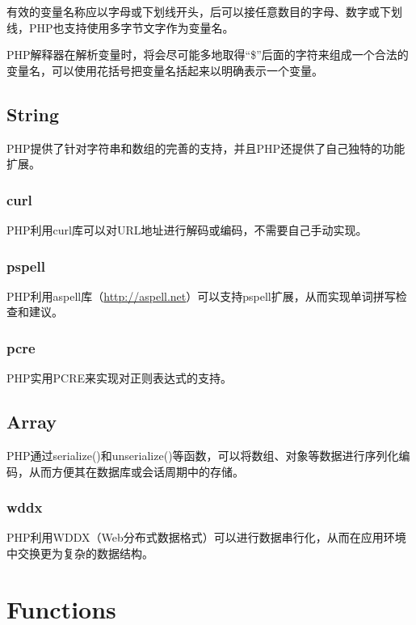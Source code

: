 有效的变量名称应以字母或下划线开头，后可以接任意数目的字母、数字或下划线，PHP也支持使用多字节文字作为变量名。

PHP解释器在解析变量时，将会尽可能多地取得“\$”后面的字符来组成一个合法的变量名，可以使用花括号把变量名括起来以明确表示一个变量。




\section{String}

PHP提供了针对字符串和数组的完善的支持，并且PHP还提供了自己独特的功能扩展。

\subsection{curl}

PHP利用curl库可以对URL地址进行解码或编码，不需要自己手动实现。


\subsection{pspell}

PHP利用aspell库（\url{http://aspell.net}）可以支持pspell扩展，从而实现单词拼写检查和建议。

\subsection{pcre}

PHP实用PCRE来实现对正则表达式的支持。




\section{Array}



PHP通过serialize()和unserialize()等函数，可以将数组、对象等数据进行序列化编码，从而方便其在数据库或会话周期中的存储。


\subsection{wddx}

PHP利用WDDX（Web分布式数据格式）可以进行数据串行化，从而在应用环境中交换更为复杂的数据结构。




\chapter{Functions}


